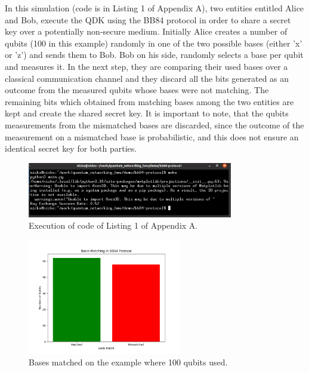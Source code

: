 \documentclass[12pt,a4paper] {report}
\begin{document}
		In this simulation (code is in Listing 1 of Appendix A),
		two entities entitled Alice and Bob, execute the QDK using the BB84 protocol
		in order to share a secret key over a potentially non-secure medium. Initially Alice creates
		a number of qubits (100 in this example) randomly in one of the two possible bases (either 'x' or 'z') and sends them 
		to Bob. Bob on his side, randomly selects a base per qubit and measures it. In the next step, 
		they are comparing their used bases over a classical communication channel and 
		they discard all the bits generated as an outcome from the measured qubits whose bases were not matching.
		The remaining bits which obtained from matching bases among the two entities are kept and create the shared secret key.
		It is important to note, that the qubits measurements from the mismatched bases are 
		discarded, since the outcome of the measurement on a mismatched base is probabilistic,
		and this does not ensure an identical secret key for both parties.
		\begin{figure}[h!]
			\centering
			\includegraphics[width=0.8\textwidth]{bb84/success_rate_terminal.png}
			\caption{Execution of code of Listing 1 of Appendix A.}
			\label{fig:}
		\end{figure}		

		\begin{figure}[h!]
			\centering
			\includegraphics[width=0.6\textwidth]{bb84/basis_matching.png}
			\caption{Bases matched on the example where 100 qubits used.}
			\label{fig:}
		\end{figure}		
\end{document}
